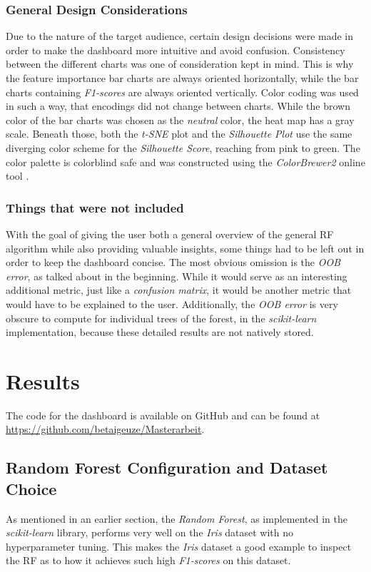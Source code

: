 \documentclass[a4paper, 12pt]{article}
\begin{document}
\subsubsection{General Design Considerations}
Due to the nature of the target audience, certain design decisions were made in order to make the
dashboard more intuitive and avoid confusion. Consistency between the different charts was one of
consideration kept in mind. This is why the feature importance bar charts are always oriented
horizontally, while the bar charts containing \textit{F1-scores} are always oriented vertically.
Color coding was used in such a way, that encodings did not change between charts. While the brown
color of the bar charts was chosen as the \textit{neutral} color, the heat map has a gray scale.
Beneath those, both the \textit{t-SNE} plot and the \textit{Silhouette Plot} use the same diverging
color scheme for the \textit{Silhouette Score}, reaching from pink to green. The color palette is
colorblind safe and was constructed using the \textit{ColorBrewer2} \cite{brewer1994guidelines}
online tool \cite{harrower2003colorbrewer}.

\subsubsection{Things that were not included}
With the goal of giving the user both a general overview of the general RF algorithm while also
providing valuable insights, some things had to be left out in order to keep the dashboard concise.
The most obvious omission is the \textit{OOB error}, as talked about in the beginning. While it
would serve as an interesting additional metric, just like a \textit{confusion matrix}, it would
be another metric that would have to be explained to the user. Additionally, the \textit{OOB error}
is very obscure to compute for individual trees of the forest, in the \textit{scikit-learn}
implementation, because these detailed results are not natively stored.

\section{Results}
The code for the dashboard is available on GitHub and can be found at
\url{https://github.com/betaigeuze/Masterarbeit}.
\subsection{Random Forest Configuration and Dataset Choice}
As mentioned in an earlier section, the \textit{Random Forest}, as implemented in the
\textit{scikit-learn} library, performs very well on the \textit{Iris} dataset with no hyperparameter
tuning. This makes the \textit{Iris} dataset a good example to inspect the RF as to how it achieves
such high \textit{F1-scores} on this dataset. \par
\end{document}
